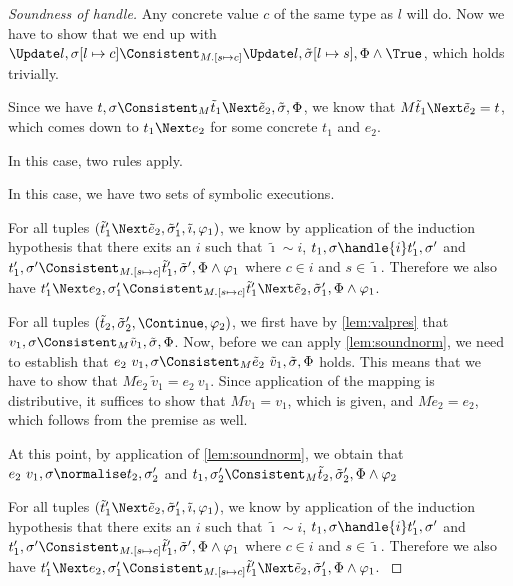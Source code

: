 \begin{proof}[Soundness of handle]
{Any concrete value $c$ of the same type as $l$ will do. Now we have to show that we end up with $\Update l,\sigma[l\mapsto c]\Consistent_{M.[s\mapsto c]}\Update l,\tilde{\sigma}[l\mapsto s],\Phi\land\True$, which holds trivially.
}


 {
Since we have $t,\sigma\Consistent_M\tilde{t}_1\Next \tilde{e}_2,\tilde{\sigma},\Phi$, we know that $M \tilde{t}_1\Next \tilde{e}_2=t$, which comes down to $t_1\Next e_2$ for some concrete $t_1$ and $e_2$.

 In this case, two rules apply.\\


{
In this case, we have two sets of symbolic executions.

For all tuples $(\tilde{t}_1'\Next \tilde{e}_2,\tilde{\sigma}_1',\tilde{\imath},\phi_1)$, we know by application of the induction hypothesis that
there exits an $i$ such that $\tilde{\imath}\sim i$, $t_1,\sigma\handle{i}t_1',\sigma'$ and
$t_1',\sigma'\Consistent_{M.[s\mapsto c]}\tilde{t}_1',\tilde{\sigma}',\Phi\land\phi_1$ where $c\in i$ and $s\in \tilde{\imath}$.
Therefore we also have $t_1'\Next e_2,\sigma_1'\Consistent_{M.[s\mapsto c]}\tilde{t}_1'\Next \tilde{e}_2,\tilde{\sigma}_1',\Phi\land\phi_1$.

For all tuples $(\tilde{t}_2,\tilde{\sigma}_2',\Continue,\phi_2)$, we first have by \cref{lem:valpres} that
$v_1,\sigma\Consistent_M\tilde{v}_1,\tilde{\sigma},\Phi$.
Now, before we can apply \cref{lem:soundnorm}, we need to establish that
$e_2\ v_1,\sigma\Consistent_M\tilde{e}_2\ \tilde{v}_1,\tilde{\sigma},\Phi$ holds.
This means that we have to show that $M \tilde{e}_2\ \tilde{v}_1 = e_2\ v_1$.
Since application of the mapping is distributive, it suffices to show that $M\tilde{v}_1=v_1$, which is given,
and $M\tilde{e}_2=e_2$, which follows from the premise as well.

At this point, by application of \cref{lem:soundnorm}, we obtain that $e_2\ v_1,\sigma\normalise t_2,\sigma_2'$
and $t_1,\sigma_2'\Consistent_M\tilde{t}_2,\tilde{\sigma}_2',\Phi\land\phi_2$
}
%
{
For all tuples $(\tilde{t}_1'\Next \tilde{e}_2,\tilde{\sigma}_1',\tilde{\imath},\phi_1)$, we know by application of the induction hypothesis that
there exits an $i$ such that $\tilde{\imath}\sim i$, $t_1,\sigma\handle{i}t_1',\sigma'$ and
$t_1',\sigma'\Consistent_{M.[s\mapsto c]}\tilde{t}_1',\tilde{\sigma}',\Phi\land\phi_1$ where $c\in i$ and $s\in \tilde{\imath}$.
Therefore we also have $t_1'\Next e_2,\sigma_1'\Consistent_{M.[s\mapsto c]}\tilde{t}_1'\Next \tilde{e}_2,\tilde{\sigma}_1',\Phi\land\phi_1$.
}
}


\end{proof}
